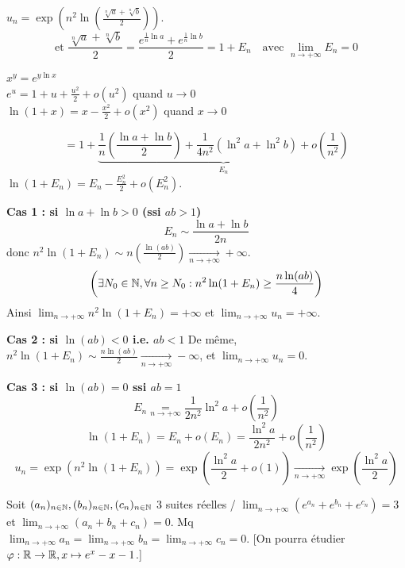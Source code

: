 \begin{solution}
$u_n = \exp\left( n^2 \ln \left( \frac{\sqrt[n]{a} + \sqrt[n]{b}}{2} \right) \right)$.
\[
\text{et } \frac{\sqrt[n]{a} + \sqrt[n]{b}}{2} = \frac{e^{\frac{1}{n} \ln a} + e^{\frac{1}{n} \ln b}}{2} = 1 + E_n \quad \text{avec } \lim_{n \to +\infty} E_n = 0
\]
\begin{remarkbox}
$x^y = e^{y \ln x}$ \\
$e^u = 1 + u + \frac{u^2}{2} + o(u^2)$ quand $u \to 0$ \\
$\ln(1+x) = x - \frac{x^2}{2} + o(x^2)$ quand $x \to 0$
\end{remarkbox}
\[
= 1 + \underbrace{\frac{1}{n} \left( \frac{\ln a + \ln b}{2} \right) + \frac{1}{4n^2} (\ln^2 a + \ln^2 b) + o\left(\frac{1}{n^2}\right)}_{E_n}
\]
$\ln(1 + E_n) = E_n - \frac{E_n^2}{2} + o(E_n^2)$.

\textbf{Cas 1 : si $\ln a + \ln b > 0$ (ssi $ab > 1$)}
\[
E_n \sim \frac{\ln a + \ln b}{2n}
\]
donc $n^2 \ln(1 + E_n) \sim n \left( \frac{\ln(ab)}{2} \right) \xrightarrow[n \to +\infty]{} +\infty$.
\[
\left( \exists N_0 \in \mathbb N, \forall n \geq N_0 : n^2 \ln(1 + E_n) \geq \frac{n \ln(ab)}{4} \right)
\]
Ainsi $\lim_{n \to +\infty} n^2 \ln(1 + E_n) = +\infty$ et $\lim_{n \to +\infty} u_n = +\infty$.

\textbf{Cas 2 : si $\ln(ab) < 0$ i.e. $ab < 1$}
De même, $n^2 \ln(1 + E_n) \sim \frac{n \ln(ab)}{2} \xrightarrow[n \to +\infty]{} -\infty$,
et $\lim_{n \to +\infty} u_n = 0$.

\textbf{Cas 3 : si $\ln(ab) = 0$ ssi $ab = 1$}
\[
E_n \underset{n \to +\infty}{=} \frac{1}{2n^2} \ln^2 a + o\left(\frac{1}{n^2}\right)
\]
\[
\ln(1 + E_n) = E_n + o(E_n) = \frac{\ln^2 a}{2n^2} + o\left(\frac{1}{n^2}\right)
\]
\[
u_n = \exp(n^2 \ln(1 + E_n)) = \exp\left( \frac{\ln^2 a}{2} + o(1) \right) \xrightarrow[n \to +\infty]{} \exp\left( \frac{\ln^2 a}{2} \right)
\]
\end{solution}


\begin{statementbox}
Soit $(a_n)_{n \in \mathbb N}, (b_n)_{n \in \mathbb N}, (c_n)_{n \in \mathbb N}$ 3 suites réelles /
$\lim_{n \to +\infty} (e^{a_n} + e^{b_n} + e^{c_n}) = 3$ et $\lim_{n \to +\infty} (a_n + b_n + c_n) = 0$.
Mq $\lim_{n \to +\infty} a_n = \lim_{n \to +\infty} b_n = \lim_{n \to +\infty} c_n = 0$.
[On pourra étudier $\varphi : \mathbb R \to \mathbb R, x \mapsto e^x - x - 1$.]
\end{statementbox}

